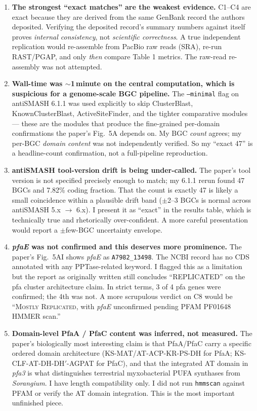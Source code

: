 \documentclass[11pt,letterpaper]{article}
\begin{document}
\begin{enumerate}
\item \textbf{The strongest ``exact matches'' are the weakest evidence.} C1--C4 are exact because they are derived from the same GenBank record the authors deposited. Verifying the deposited record's summary numbers against itself proves \emph{internal consistency}, not \emph{scientific correctness}. A true independent replication would re-assemble from PacBio raw reads (SRA), re-run RAST/PGAP, and only \emph{then} compare Table 1 metrics. The raw-read re-assembly was not attempted.
\item \textbf{Wall-time was $\sim$1\,minute on the central computation, which is suspicious for a genome-scale BGC pipeline.} The \texttt{--minimal} flag on antiSMASH 6.1.1 was used explicitly to skip ClusterBlast, KnownClusterBlast, ActiveSiteFinder, and the tighter comparative modules --- these are the modules that produce the fine-grained per-domain confirmations the paper's Fig.\ 5A depends on. My BGC \emph{count} agrees; my per-BGC \emph{domain content} was not independently verified. So my ``exact 47'' is a headline-count confirmation, not a full-pipeline reproduction.
\item \textbf{antiSMASH tool-version drift is being under-called.} The paper's tool version is not specified precisely enough to match; my 6.1.1 rerun found 47 BGCs and 7.82\% coding fraction. That the count is exactly 47 is likely a small coincidence within a plausible drift band ($\pm$2--3 BGCs is normal across antiSMASH 5.x $\to$ 6.x). I present it as ``exact'' in the results table, which is technically true and rhetorically over-confident. A more careful presentation would report a $\pm$few-BGC uncertainty envelope.
\item \textbf{\emph{pfaE} was not confirmed and this deserves more prominence.} The paper's Fig.\ 5AI shows \emph{pfaE} as \texttt{A7982\_13498}. The NCBI record has no CDS annotated with any PPTase-related keyword. I flagged this as a limitation but the report as originally written still concludes ``REPLICATED'' on the pfa cluster architecture claim. In strict terms, 3 of 4 pfa genes were confirmed; the 4th was not. A more scrupulous verdict on C8 would be ``\textsc{Mostly Replicated}, with \emph{pfaE} unconfirmed pending PFAM PF01648 HMMER scan.''
\item \textbf{Domain-level PfaA / PfaC content was inferred, not measured.} The paper's biologically most interesting claim is that PfaA/PfaC carry a specific ordered domain architecture (KS-MAT/AT-ACP-KR-PS-DH for PfaA; KS-CLF-AT-DH-DH$'$-AGPAT for PfaC), and that the integrated AT domain in \emph{pfa3} is what distinguishes terrestrial myxobacterial PUFA synthases from \emph{Sorangium}. I have length compatibility only. I did not run \texttt{hmmscan} against PFAM or verify the AT domain integration. This is the most important unfinished piece.

\end{enumerate}
\end{document}
